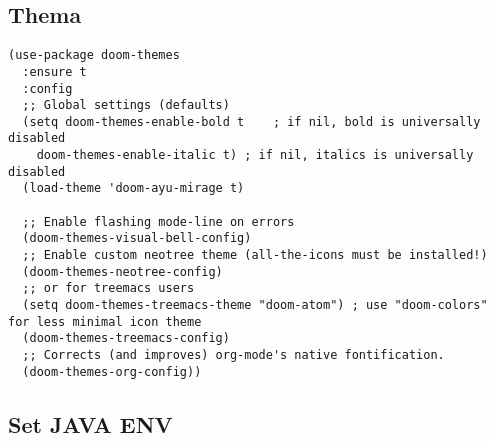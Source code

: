 \documentclass[11pt]{article}
\begin{document}
\subsection{Thema}
\label{sec:org0f7c3bd}
\begin{verbatim}
(use-package doom-themes
  :ensure t
  :config
  ;; Global settings (defaults)
  (setq doom-themes-enable-bold t    ; if nil, bold is universally disabled
	doom-themes-enable-italic t) ; if nil, italics is universally disabled
  (load-theme 'doom-ayu-mirage t)

  ;; Enable flashing mode-line on errors
  (doom-themes-visual-bell-config)
  ;; Enable custom neotree theme (all-the-icons must be installed!)
  (doom-themes-neotree-config)
  ;; or for treemacs users
  (setq doom-themes-treemacs-theme "doom-atom") ; use "doom-colors" for less minimal icon theme
  (doom-themes-treemacs-config)
  ;; Corrects (and improves) org-mode's native fontification.
  (doom-themes-org-config))
\end{verbatim}

\subsection{Set JAVA ENV}
\label{sec:org5e0dd18}
\end{document}
